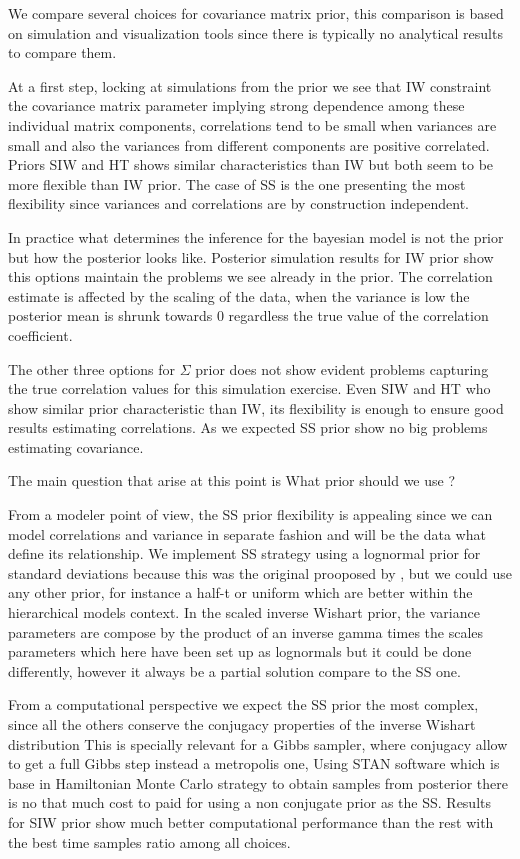 \documentclass{article}
\begin{document}
We compare several choices for covariance matrix prior, this comparison is based on simulation and visualization tools since there is typically no analytical results to compare them. 

At a first step, locking at simulations from the prior we see that IW constraint the covariance matrix parameter implying strong dependence among these individual matrix components, correlations tend to be small when variances are small and also the variances from different components are positive correlated.  Priors SIW and HT shows similar characteristics than IW but both seem to be more flexible than IW prior. The case of SS is the one presenting the most flexibility since variances and correlations are by construction independent.

In practice what determines the inference for the bayesian model is not the prior but how the posterior looks like. Posterior simulation results for IW prior show this options maintain the problems we see already in the prior.  The correlation estimate is affected by the scaling of the data, when the variance is low the posterior mean is shrunk towards 0 regardless the true value of the correlation coefficient. 

The other three options for $\Sigma$ prior does not show evident problems capturing the true correlation values for this simulation exercise. Even  SIW and HT who show similar prior characteristic than IW, its flexibility is enough to ensure good results estimating correlations. As we expected SS prior show no big problems estimating  covariance. 

The main question that arise at this point is What prior should we use ? 

From a modeler point of view, the SS prior flexibility is appealing since we can model correlations and variance in separate fashion and will be the data what define its relationship. 
We implement SS strategy using a lognormal prior for standard deviations because this was the original prooposed by \cite{barnard2000}, but we could use any other prior, for instance a half-t or uniform which are better within the hierarchical models context.  In the scaled inverse Wishart prior, the variance parameters are compose by the product of an inverse gamma times the scales parameters which here have been set up as lognormals but it could be done differently, however it always be a partial solution compare to the SS one. 

From a computational perspective we expect the SS prior the most complex, since all the others conserve the conjugacy properties of the inverse Wishart distribution This is specially relevant for a Gibbs sampler, where conjugacy allow to get a full Gibbs step instead a metropolis one, Using STAN software which is base in Hamiltonian Monte Carlo strategy to obtain samples from posterior there is no that much cost to paid for using a non conjugate prior as the SS.  Results for SIW prior show much better computational performance than the rest with the best time samples ratio among all choices.  
\end{document}
